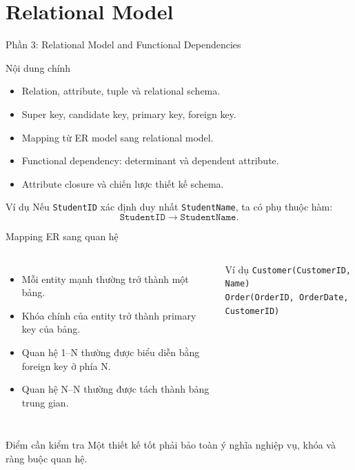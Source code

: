 \documentclass[aspectratio=169,11pt]{beamer}
\begin{document}
\section{Relational Model}
\begin{frame}{Phần 3: Relational Model and Functional Dependencies}
\begin{block}{Nội dung chính}
\begin{itemize}
  \item Relation, attribute, tuple và relational schema.
  \item Super key, candidate key, primary key, foreign key.
  \item Mapping từ ER model sang relational model.
  \item Functional dependency: determinant và dependent attribute.
  \item Attribute closure và chiến lược thiết kế schema.
\end{itemize}
\end{block}

\begin{exampleblock}{Ví dụ}
Nếu \texttt{StudentID} xác định duy nhất \texttt{StudentName}, ta có phụ thuộc hàm:
\[
\texttt{StudentID} \rightarrow \texttt{StudentName}.
\]
\end{exampleblock}
\end{frame}

\begin{frame}{Mapping ER sang quan hệ}
\begin{columns}[T,onlytextwidth]
\begin{itemize}
  \item Mỗi entity mạnh thường trở thành một bảng.
  \item Khóa chính của entity trở thành primary key của bảng.
  \item Quan hệ 1--N thường được biểu diễn bằng foreign key ở phía N.
  \item Quan hệ N--N thường được tách thành bảng trung gian.
\end{itemize}
\begin{block}{Ví dụ}
\texttt{Customer(CustomerID, Name)}\\
\texttt{Order(OrderID, OrderDate, CustomerID)}
\end{block}
\end{columns}

\begin{alertblock}{Điểm cần kiểm tra}
Một thiết kế tốt phải bảo toàn ý nghĩa nghiệp vụ, khóa và ràng buộc quan hệ.
\end{alertblock}
\end{frame}
\end{document}
